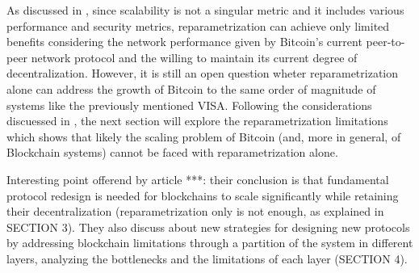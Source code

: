 As discussed in \cite{}, since scalability is not a singular metric and it
includes various performance and security metrics, reparametrization can achieve
only limited benefits considering the network performance given by Bitcoin’s
current peer-to-peer network protocol and the willing to maintain its current
degree of decentralization. However, it is still an open question wheter
reparametrization alone can address the growth of Bitcoin to the same order of
magnitude of systems like the previously mentioned VISA. Following the
considerations discuessed in \cite{}, the next section will explore the
reparametrization limitations which shows that likely the scaling problem of
Bitcoin (and, more in general, of Blockchain systems) cannot be faced with
reparametrization alone.


Interesting point offerend by article ***: their conclusion is that fundamental
protocol redesign is needed for blockchains to scale significantly while
retaining their decentralization (reparametrization only is not enough, as
explained in SECTION 3). They also discuss about new strategies for designing
new protocols by addressing blockchain limitations through a partition of the
system in different layers, analyzing the bottlenecks and the limitations of
each layer (SECTION 4).
